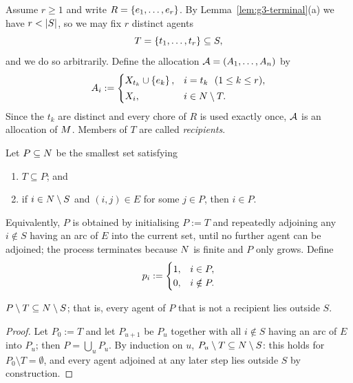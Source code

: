 Assume $r \ge 1$ and write $R = \left\{e_1,\dots,e_r\right\}$. By
Lemma~\ref{lem:g3-terminal}(a) we have $r < \left\lvert S\right\rvert$, so we may fix $r$
distinct agents
\[
  T = \left\{t_1,\dots,t_r\right\} \subseteq S ,
\]
and we do so arbitrarily. Define the allocation $\mathcal{A} = (A_1,\dots,A_n)$ by
\begin{equation}
\label{eq:g3-alloc}
  A_i :=
  \begin{cases}
    X_{t_k} \cup \left\{e_k\right\}, & i = t_k \ \ (1 \le k \le r),\\[2pt]
    X_i, & i \in N \setminus T .
  \end{cases}
\end{equation}
Since the $t_k$ are distinct and every chore of $R$ is used exactly once,
$\mathcal{A}$ is an allocation of $M$. Members of $T$ are called
\emph{recipients}.

\begin{definition}
\label{def:g3-P}
Let $P \subseteq N$ be the smallest set satisfying
\begin{enumerate}
  \item[(P1)] $T \subseteq P$; and
  \item[(P2)] if $i \in N \setminus S$ and $(i,j) \in E$ for some
        $j \in P$, then $i \in P$.
\end{enumerate}
Equivalently, $P$ is obtained by initialising $P := T$ and repeatedly
adjoining any $i \notin S$ having an arc of $E$ into the current set, until
no further agent can be adjoined; the process terminates because $N$ is
finite and $P$ only grows. Define
\begin{equation}
\label{eq:g3-subsidy}
  p_i := \begin{cases} 1, & i \in P,\\ 0, & i \notin P.\end{cases}
\end{equation}
\end{definition}

\begin{lemma}
\label{lem:g3-Pstructure}
$P \setminus T \subseteq N \setminus S$; that is, every agent of $P$
that is not a recipient lies outside $S$.
\end{lemma}
\begin{proof}
Let $P_0 := T$ and let $P_{u+1}$ be $P_u$ together with all $i \notin S$
having an arc of $E$ into $P_u$; then $P = \bigcup_u P_u$. By induction on
$u$, $P_u \setminus T \subseteq N \setminus S$: this holds for
$P_0 \setminus T = \emptyset$, and every agent adjoined at any later step
lies outside $S$ by construction.
\end{proof}


